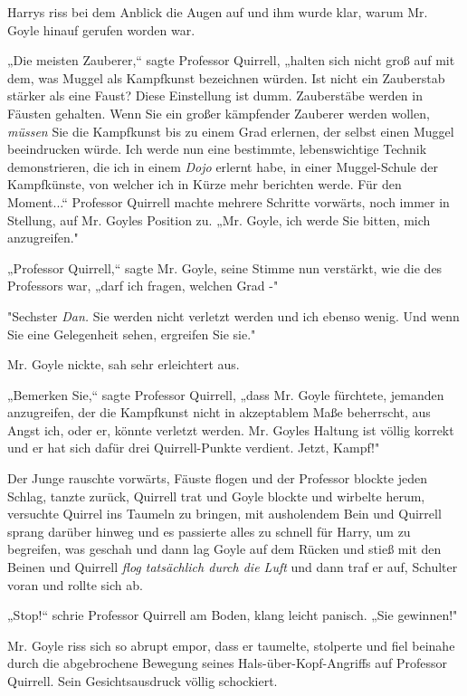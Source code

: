{Harrys riss bei dem Anblick die Augen auf und ihm wurde klar, warum Mr. Goyle hinauf gerufen worden war.

„Die meisten Zauberer,“ sagte Professor Quirrell, „halten sich nicht groß auf mit dem, was Muggel als Kampfkunst bezeichnen würden. Ist nicht ein Zauberstab stärker als eine Faust? Diese Einstellung ist dumm. Zauberstäbe werden in Fäusten gehalten. Wenn Sie ein großer kämpfender Zauberer werden wollen, \emph{müssen} Sie die Kampfkunst bis zu einem Grad erlernen, der selbst einen Muggel beeindrucken würde. Ich werde nun eine bestimmte, lebenswichtige Technik demonstrieren, die ich in einem \emph{Dojo} erlernt habe, in einer Muggel-Schule der Kampfkünste, von welcher ich in Kürze mehr berichten werde. Für den Moment...“ Professor Quirrell machte mehrere Schritte vorwärts, noch immer in Stellung, auf Mr. Goyles Position zu. „Mr. Goyle, ich werde Sie bitten, mich anzugreifen."

„Professor Quirrell,“ sagte Mr. Goyle, seine Stimme nun verstärkt, wie die des Professors war, „darf ich fragen, welchen Grad -"

"Sechster \emph{Dan.} Sie werden nicht verletzt werden und ich ebenso wenig. Und wenn Sie eine Gelegenheit sehen, ergreifen Sie sie."

Mr. Goyle nickte, sah sehr erleichtert aus.

„Bemerken Sie,“ sagte Professor Quirrell, „dass Mr. Goyle fürchtete, jemanden anzugreifen, der die Kampfkunst nicht in akzeptablem Maße beherrscht, aus Angst ich, oder er, könnte verletzt werden. Mr. Goyles Haltung ist völlig korrekt und er hat sich dafür drei Quirrell-Punkte verdient. Jetzt, Kampf!"

Der Junge rauschte vorwärts, Fäuste flogen und der Professor blockte jeden Schlag, tanzte zurück, Quirrell trat und Goyle blockte und wirbelte herum, versuchte Quirrel ins Taumeln zu bringen, mit ausholendem Bein und Quirrell sprang darüber hinweg und es passierte alles zu schnell für Harry, um zu begreifen, was geschah und dann lag Goyle auf dem Rücken und stieß mit den Beinen und Quirrell \emph{flog tatsächlich durch die Luft} und dann traf er auf, Schulter voran und rollte sich ab.

„Stop!“ schrie Professor Quirrell am Boden, klang leicht panisch. „Sie gewinnen!"

Mr. Goyle riss sich so abrupt empor, dass er taumelte, stolperte und fiel beinahe durch die abgebrochene Bewegung seines Hals-über-Kopf-Angriffs auf Professor Quirrell. Sein Gesichtsausdruck völlig schockiert.

}
